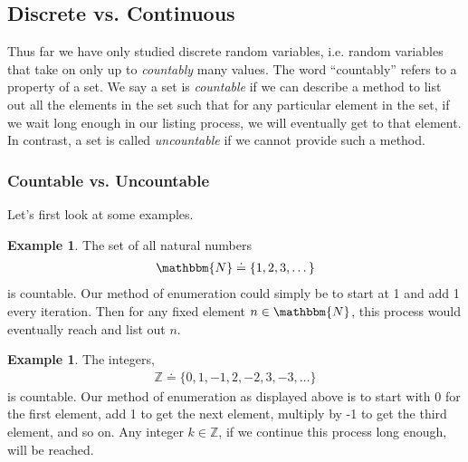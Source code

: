 \documentclass[11pt,letterpaper]{article}
\newcommand\nat{\mathbbm{N}}
\numberwithin{theorem}{section}
\numberwithin{definition}{section}
\numberwithin{lemma}{section}
\numberwithin{corollary}{section}
\numberwithin{proposition}{section}
\theoremstyle{definition}
\numberwithin{remark}{section}
\numberwithin{claim}{section}
\numberwithin{observation}{section}
\numberwithin{fact}{section}
\numberwithin{assumption}{section}
\newtheorem{example}[theorem]{Example}
\numberwithin{example}{section}
\numberwithin{exercise}{section}
\begin{document}
\newpage

\subsection{Discrete vs. Continuous}
Thus far we have only studied discrete random variables, i.e. random variables that take on only up to \textit{countably} many values. The word ``countably'' refers to a property of a set. We say a set is \textit{countable} if we can describe a method to list out all the elements in the set such that for any particular element in the set, if we wait long enough in our listing process, we will eventually get to that element. In contrast, a set is called \textit{uncountable} if we cannot provide such a method. 

\subsubsection{Countable vs. Uncountable}
Let's first look at some examples.

\begin{example}
The set of all natural numbers
\begin{align*}
\nat \doteq \{1,2,3,\dots\}
\end{align*}
is countable. Our method of enumeration could simply be to start at 1 and add 1 every iteration. Then for any fixed element $n \in \nat$, this process would eventually reach and list out $n$.
\end{example}

\begin{example}
The integers,
\begin{align*}
\mathbb{Z} \doteq \{0,1,-1,2,-2,3,-3,\dots\}
\end{align*}
is countable. Our method of enumeration as displayed above is to start with 0 for the first element, add 1 to get the next element, multiply by -1 to get the third element, and so on. Any integer $k \in \mathbb{Z}$, if we continue this process long enough, will be reached.
\end{example}
\end{document}
